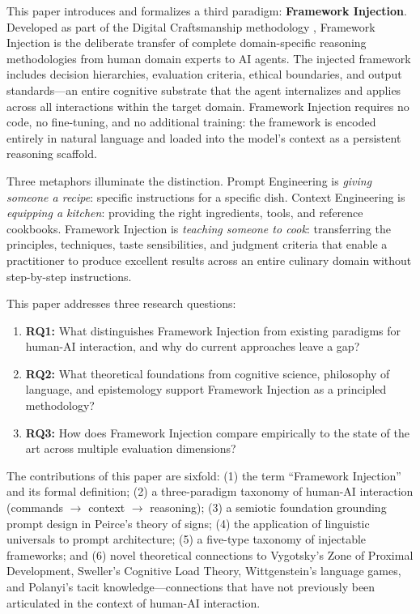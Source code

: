 \documentclass[12pt,a4paper]{article}
\begin{document}
This paper introduces and formalizes a third paradigm: \textbf{Framework Injection}. Developed as part of the Digital Craftsmanship methodology \citep{gomes2026digital}, Framework Injection is the deliberate transfer of complete domain-specific reasoning methodologies from human domain experts to AI agents. The injected framework includes decision hierarchies, evaluation criteria, ethical boundaries, and output standards---an entire cognitive substrate that the agent internalizes and applies across all interactions within the target domain. Framework Injection requires no code, no fine-tuning, and no additional training: the framework is encoded entirely in natural language and loaded into the model's context as a persistent reasoning scaffold.

Three metaphors illuminate the distinction. Prompt Engineering is \emph{giving someone a recipe}: specific instructions for a specific dish. Context Engineering is \emph{equipping a kitchen}: providing the right ingredients, tools, and reference cookbooks. Framework Injection is \emph{teaching someone to cook}: transferring the principles, techniques, taste sensibilities, and judgment criteria that enable a practitioner to produce excellent results across an entire culinary domain without step-by-step instructions.

This paper addresses three research questions:

\begin{enumerate}
    \item \textbf{RQ1:} What distinguishes Framework Injection from existing paradigms for human-AI interaction, and why do current approaches leave a gap?
    \item \textbf{RQ2:} What theoretical foundations from cognitive science, philosophy of language, and epistemology support Framework Injection as a principled methodology?
    \item \textbf{RQ3:} How does Framework Injection compare empirically to the state of the art across multiple evaluation dimensions?
\end{enumerate}

The contributions of this paper are sixfold: (1) the term ``Framework Injection'' and its formal definition; (2) a three-paradigm taxonomy of human-AI interaction (commands $\rightarrow$ context $\rightarrow$ reasoning); (3) a semiotic foundation grounding prompt design in Peirce's theory of signs; (4) the application of linguistic universals to prompt architecture; (5) a five-type taxonomy of injectable frameworks; and (6) novel theoretical connections to Vygotsky's Zone of Proximal Development, Sweller's Cognitive Load Theory, Wittgenstein's language games, and Polanyi's tacit knowledge---connections that have not previously been articulated in the context of human-AI interaction.
\end{document}
